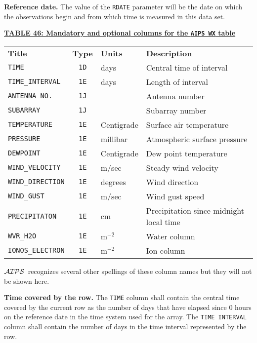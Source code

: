 \documentclass[twoside]{article}
\newcommand{\Hi}[1]{\textcolor{hicol}{#1}}
\newcommand{\AIPS}{{$\cal AIPS\/$}}
\begin{document}
{\bf Reference date.} The value of the {\tt RDATE} parameter will be
the date on which the observations begin and from which time is
measured in this data set.
\vfill\eject

\begin{center}
\underline{\bf{TABLE 46: Mandatory \Hi{and optional} columns for the
    {\tt AIPS WX} table}}\\
\begin{tabular}{lcll}
\noalign{\vspace{2pt}} \label{ta:WXcols}
\underline{{\bf Title\vphantom{y}}} & \underline{\bf{Type}} &
   \underline{{\bf Units\vphantom{y}}} & \underline{\bf{Description}} \\
\noalign{\vspace{2pt}}
{\tt TIME}           & {\tt 1D} & days & Central time of interval \\
{\tt TIME\_INTERVAL} & {\tt 1E} & days & Length of interval \\
{\tt ANTENNA NO.}   & {\tt 1J} &      & Antenna number \\
{\tt SUBARRAY}      & {\tt 1J} &      & Subarray number \\
{\tt TEMPERATURE}   & {\tt 1E} & Centigrade & Surface air temperature \\
{\tt PRESSURE}      & {\tt 1E} & millibar   & Atmospheric surface pressure \\
{\tt DEWPOINT}      & {\tt 1E} & Centigrade & Dew point temperature \\
{\tt WIND\_VELOCITY} & {\tt 1E} & m/sec     & Steady wind velocity \\
{\tt WIND\_DIRECTION} & {\tt 1E} & degrees  & Wind direction \\
\hline
\Hi{\tt WIND\_GUST}  & \Hi{\tt 1E} & \Hi{m/sec} &
                                       \Hi{Wind gust speed} \\
\Hi{\tt PRECIPITATON} & \Hi{\tt 1E} & \Hi{cm} &
                   \Hi{Precipitation since midnight local time} \\
{\tt WVR\_H2O}       & {\tt 1E} & m$^{-2}$  & Water column \\
{\tt IONOS\_ELECTRON} & {\tt 1E} & m$^{-2}$ & Ion column
\end{tabular}
\end{center}

\AIPS\ recognizes several other spellings of these column names but
they will not be shown here.

{\bf Time covered by the row.}  The {\tt TIME} column shall contain
the central time covered by the current row as the number of days
that have elapsed since 0 hours on the reference date in the time
system used for the array.  The {\tt TIME INTERVAL} column shall
contain the number of days in the time interval represented by the
row.
\end{document}
